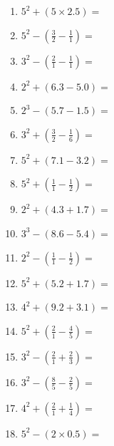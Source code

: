 \documentclass[12pt]{article}
\begin{document}
    \begin{enumerate}
\item \large $ 5^{2} + (5 \times 2.5) = $ \vspace{1.4cm}
\item \large $ 5^{2} - (\frac{3}{2} - \frac{1}{1}) = $ \vspace{1.4cm}
\item \large $ 3^{2} - (\frac{2}{1} - \frac{1}{1}) = $ \vspace{1.4cm}
\item \large $ 2^{2} + (6.3 - 5.0) = $ \vspace{1.4cm}
\item \large $ 2^{3} - (5.7 - 1.5) = $ \vspace{1.4cm}
\item \large $ 3^{2} + (\frac{3}{2} - \frac{1}{6}) = $ \vspace{1.4cm}
\item \large $ 5^{2} + (7.1 - 3.2) = $ \vspace{1.4cm}
\item \large $ 5^{2} + (\frac{1}{1} - \frac{1}{2}) = $ \vspace{1.4cm}
\newpage
\item \large $ 2^{2} + (4.3 + 1.7) = $ \vspace{1.4cm}
\item \large $ 3^{3} - (8.6 - 5.4) = $ \vspace{1.4cm}
\item \large $ 2^{2} - (\frac{1}{1} - \frac{1}{2}) = $ \vspace{1.4cm}
\item \large $ 5^{2} + (5.2 + 1.7) = $ \vspace{1.4cm}
\item \large $ 4^{2} + (9.2 + 3.1) = $ \vspace{1.4cm}
\item \large $ 5^{2} + (\frac{2}{1} - \frac{4}{5}) = $ \vspace{1.4cm}
\item \large $ 3^{2} - (\frac{2}{1} + \frac{2}{3}) = $ \vspace{1.4cm}
\item \large $ 3^{2} - (\frac{8}{5} - \frac{2}{5}) = $ \vspace{1.4cm}
\item \large $ 4^{2} + (\frac{2}{1} + \frac{1}{4}) = $ \vspace{1.4cm}
\item \large $ 5^{2} - (2 \times 0.5) = $ \vspace{1.4cm}

\end{enumerate}
\end{document}
